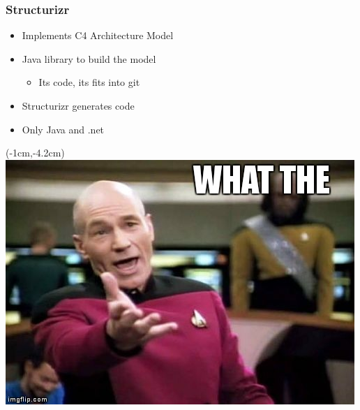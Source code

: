 \documentclass[xelatex,13pt]{beamer}
\begin{document}
\begin{frame}
	\frametitle{Structurizr}
	\begin{itemize}
		\item Implements C4 Architecture Model 
		\item Java library to build the model
			\pause
		\begin{itemize}
			\item Its code, its fits into git
		\end{itemize}
			\pause
		\item Structurizr generates code
			\pause
		\item {\huge Only Java and .net}
	\end{itemize}
\end{frame}
\begin{frame}[plain]
\begin{textblock*}{0cm}(-1cm,-4.2cm)
	\includegraphics[width=1.0\paperwidth]{picardwtf.jpg}
\end{textblock*}
\end{frame}
\end{document}
